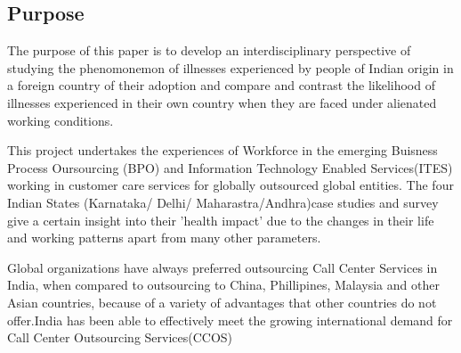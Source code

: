 \subsection{Purpose}

The purpose of this paper is to develop an interdisciplinary perspective of studying the phenomonemon of illnesses experienced by people of Indian origin in a foreign country of their adoption and compare and contrast the likelihood of illnesses experienced in their own country when they are faced under alienated working conditions. 

This project undertakes the experiences of Workforce in the emerging Buisness Process Oursourcing (BPO) and Information Technology Enabled Services(ITES) working in customer care services for globally outsourced global entities. The four Indian States (Karnataka/ Delhi/ Maharastra/Andhra)case studies and survey give a certain insight into their 'health impact' due to the changes in their life and working patterns apart from many other parameters.

Global organizations have always preferred outsourcing Call Center Services in India, when compared to outsourcing to China, Phillipines, Malaysia and other Asian countries, because of a variety of advantages that other countries do not offer.India has been able to effectively meet the growing international demand for Call Center Outsourcing Services(CCOS)  
    
    
    
